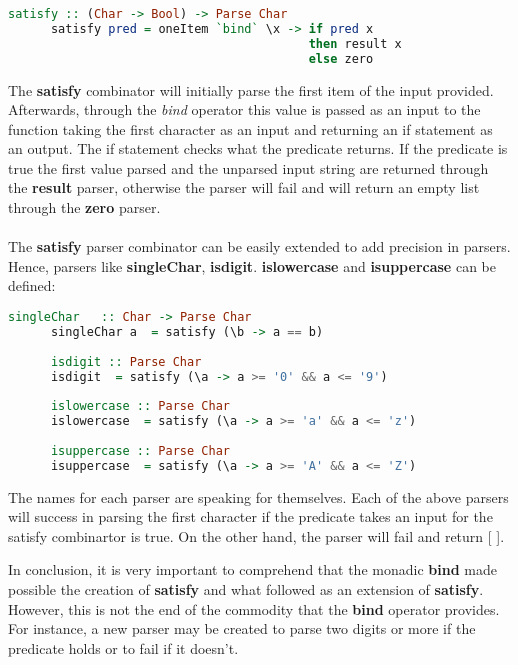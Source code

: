 \documentclass[a4paper, onecolumn]{article}
\begin{document}
    \begin{tcolorbox}
    \begin{lstlisting}[language=Haskell]
      satisfy :: (Char -> Bool) -> Parse Char
      satisfy pred = oneItem `bind` \x -> if pred x 
                                          then result x 
                                          else zero
    \end{lstlisting}
    \end{tcolorbox}
    
    The \textbf{satisfy} combinator will initially parse the first item of the input provided. Afterwards, through the \textit{bind} operator this value is passed as an input to the function taking the first character as an input and returning an if statement as an output. The if statement checks what the predicate returns. If the predicate is true the first value parsed and the unparsed input string are returned through the \textbf{result} parser, otherwise the parser will fail and will return an empty list through the \textbf{zero} parser.  \\ \\
    The \textbf{satisfy} parser combinator can be easily extended to add precision in parsers. Hence, parsers like \textbf{singleChar}, \textbf{isdigit}. \textbf{islowercase} and \textbf{isuppercase} can be defined:
    
    \begin{tcolorbox}
    \begin{lstlisting}[language=Haskell]
      singleChar   :: Char -> Parse Char
      singleChar a  = satisfy (\b -> a == b)
      
      isdigit :: Parse Char
      isdigit  = satisfy (\a -> a >= '0' && a <= '9')
      
      islowercase :: Parse Char
      islowercase  = satisfy (\a -> a >= 'a' && a <= 'z')
      
      isuppercase :: Parse Char 
      isuppercase  = satisfy (\a -> a >= 'A' && a <= 'Z')
    \end{lstlisting}
    \end{tcolorbox}
    
    The names for each parser are speaking for themselves. Each of the above parsers will success in parsing the first character if the predicate takes an input for the satisfy combinartor is true. On the other hand, the parser will fail and return [ ]. 
    
    In conclusion, it is very important to comprehend that the monadic \textbf{bind} made possible the creation of \textbf{satisfy} and what followed as an extension of \textbf{satisfy}. However, this is not the end of the commodity that the \textbf{bind} operator provides. For instance, a new parser may be created to parse two digits or more if the predicate holds or to fail if it doesn't. 
    
\end{document}
